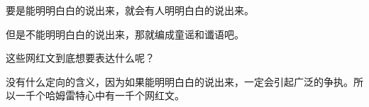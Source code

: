 \begin{zhihuanswer}
要是能明明白白的说出来，就会有人明明白白的说出来。

但是不能明明白白的说出来，那就编成童谣和谶语吧。

这些网红文到底想要表达什么呢？

没有什么定向的含义，因为如果能明明白白的说出来，一定会引起广泛的争执。所以一千个哈姆雷特心中有一千个网红文。
\end{zhihuanswer}
